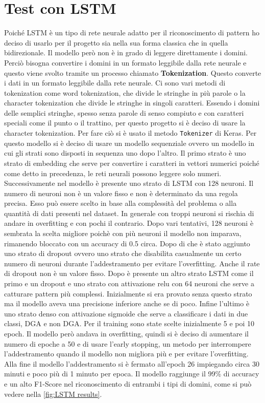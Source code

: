 \documentclass[12pt,a4paper,openright,twoside]{book}
\begin{document}
\section{Test con LSTM}
Poiché LSTM è un tipo di rete neurale adatto per il riconoscimento di pattern
ho deciso di usarlo per il progetto sia nella sua forma classica che in quella bidirezionale.
Il modello però non è in grado di leggere direttamente i domini.
Perciò bisogna convertire i domini in un formato leggibile dalla rete neurale e questo viene
svolto tramite un processo chiamato \textbf{Tokenization}.
Questo converte i dati in un formato leggibile dalla rete neurale.
Ci sono vari metodi di tokenization come word tokenization, che divide 
le stringhe in più parole o la character tokenization
che divide le stringhe in singoli caratteri. Essendo i domini delle semplici stringhe,
spesso senza parole di senso compiuto e con caratteri speciali come il punto o il trattino,
per questo progetto si è deciso di usare la character tokenization.
Per fare ciò si è usato il metodo \texttt{Tokenizer} di Keras.
Per questo modello si è deciso di usare
un modello sequenziale ovvero un modello in cui gli
strati sono disposti in sequenza uno dopo l'altro. \hfil \break
Il primo strato è uno strato di embedding che serve 
per convertire i caratteri in vettori numerici poiché
come detto in precedenza, le reti neurali
possono leggere solo numeri. \hfil \break
Successivamente nel modello è presente uno strato di LSTM
con 128 neuroni. Il numero di neuroni non 
è un valore fisso e non è determinato da una regola precisa.
Esso può essere scelto in base
alla complessità del problema o alla quantità di dati
presenti nel dataset. In generale con troppi neuroni si rischia di
andare in overfitting e con pochi il contrario. Dopo
vari tentativi, 128 neuroni è sembrata la scelta migliore poichè
con più neuroni il modello non imparava, rimanendo bloccato con un accuracy di 0.5 circa. \hfil \break
Dopo di che è stato aggiunto uno strato di dropout
ovvero uno strato che disabilita casualmente
un certo numero di neuroni durante l'addestramento 
per evitare l'overfitting. Anche il rate di dropout non
è un valore fisso.
Dopo è presente un altro strato LSTM come il primo e un dropout
e uno strato con attivazione relu con 64 neuroni che serve
a catturare pattern più complessi. Inizialmente
si era provato senza questo strato ma 
il modello aveva una precisione inferiore anche se di poco. Infine
l'ultimo è uno strato denso con attivazione sigmoide
che serve a classificare i dati in due classi, DGA e non DGA.
Per il training sono state scelte inizialmente 5 e poi 10 epoch.
Il modello però andava in overfitting, quindi si è deciso di aumentare
il numero di epoche a 50 e di usare l'early stopping, un metodo per interrompere
l'addestramento quando il modello non migliora più e per evitare l'overfitting. Alla
fine il modello l'addestramento si è fermato all'epoch 26 impiegando circa 30 minuti e poco più di 1 minuto per epoca.
Il modello raggiunge il 99\% di accuracy e un alto F1-Score nel riconoscimento di entrambi i tipi di domini,
come si può vedere nella \cref{fig:LSTM results}.
\end{document}
